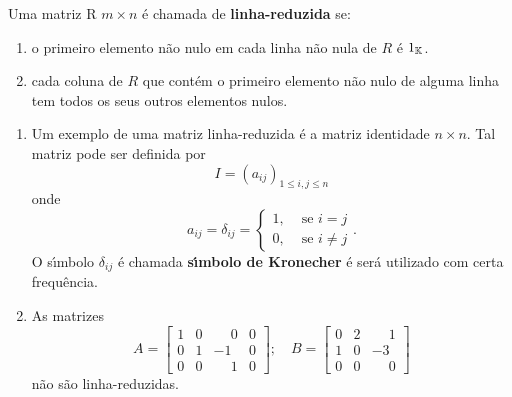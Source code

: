 \begin{definicao}\label{linhareduzida}
Uma matriz R $m \times n$ \'e chamada de \textbf{linha-reduzida} se:
\begin{enumerate}[label={\roman*})]
\item o primeiro elemento n\~ao nulo em cada linha n\~ao nula de $R$ \'e $1_{\mathbb{K}}$.
\item cada coluna de $R$ que cont\'em o primeiro elemento n\~ao nulo de alguma linha tem todos os seus outros elementos nulos.
\end{enumerate}
\end{definicao}

\begin{exemplo}
\begin{enumerate}[label={\arabic*})]
	\item Um exemplo de uma matriz linha-reduzida \'e a matriz identidade $n \times n$. Tal matriz pode ser definida por
	\[
	I = (a_{ij})_{1 \le i,j \le n}
	\]
	onde
	\[
	a_{ij} = \delta_{ij} = \begin{cases}
	1, & \mbox{ se } i = j\\
	0, & \mbox{ se } i \ne j 
	\end{cases}.
	\]
	O s{\'\i}mbolo $\delta_{ij}$ \'e chamada \textbf{s{\'\i}mbolo de Kronecher} \'e ser\'a utilizado com certa frequ\^encia.
	\item As matrizes
	\[
	A = \begin{bmatrix}
	1 & 0 & \phantom{-}0 & 0\\
	0 & 1 & -1 & 0\\
	0 & 0 & \phantom{-}1 & 0
	\end{bmatrix}; \quad B = \begin{bmatrix}
	0 & 2 & \phantom{-}1\\
	1 & 0 & -3\\
	0 & 0 & \phantom{-}0
	\end{bmatrix}
	\]
	n\~ao s\~ao linha-reduzidas.
\end{enumerate}
\end{exemplo}

